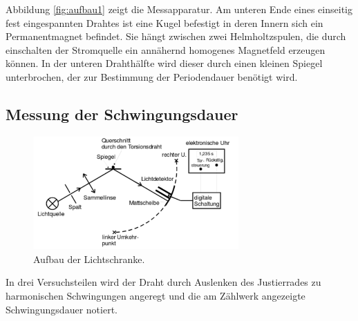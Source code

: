 Abbildung \ref{fig:aufbau1} zeigt die Messapparatur. 
Am unteren Ende eines einseitig fest eingespannten Drahtes ist eine Kugel befestigt in deren Innern sich ein Permanentmagnet befindet. Sie hängt zwischen zwei Helmholtzspulen, die durch einschalten der Stromquelle ein annähernd homogenes Magnetfeld erzeugen können.
In der unteren Drahthälfte wird dieser durch einen kleinen Spiegel unterbrochen, der zur Bestimmung der Periodendauer benötigt wird.
\subsection{Messung der Schwingungsdauer}

\begin{figure}
	\centering
	\includegraphics[width=0.7\textwidth]{Bilder/Aufbau2.pdf}
	\caption{Aufbau der Lichtschranke. \cite{V102}}
	\label{fig:aufbau2}
\end{figure}

In drei Versuchsteilen wird der Draht durch Auslenken des Justierrades zu harmonischen Schwingungen angeregt und die am Zählwerk angezeigte Schwingungsdauer notiert.

